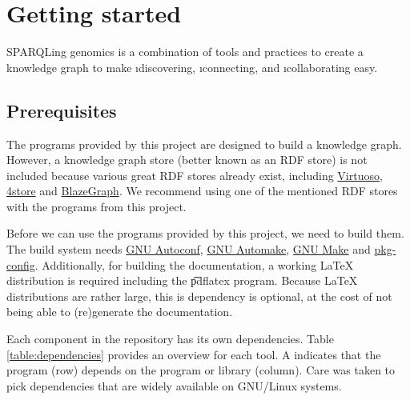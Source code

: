 \chapter{Getting started}

  SPARQLing genomics is a combination of tools and practices to create a
  knowledge graph to make \i{discovering}, \i{connecting}, and
  \i{collaborating} easy.

\section{Prerequisites}
\label{sec:prerequisites}

  The programs provided by this project are designed to build a knowledge graph.
  However, a knowledge graph store (better known as an RDF store) is not included
  because various great RDF stores already exist, including
  \href{https://virtuoso.openlinksw.com/}{Virtuoso},
  \href{https://github.com/4store/4store}{4store} and
  \href{https://www.blazegraph.com/}{BlazeGraph}.  We recommend using one of
  the mentioned RDF stores with the programs from this project.

  Before we can use the programs provided by this project, we need to build
  them.  The build system needs
  \href{https://www.gnu.org/software/autoconf}{GNU Autoconf},
  \href{https://www.gnu.org/software/automake}{GNU Automake},
  \href{https://www.gnu.org/software/make}{GNU Make} and
  \href{https://www.freedesktop.org/wiki/Software/pkg-config/}{pkg-config}.
  Additionally, for building the documentation, a working \LaTeX{} distribution is
  required including the \t{pdflatex} program.  Because \LaTeX{} distributions
  are rather large, this is dependency is optional, at the cost of not being able
  to (re)generate the documentation.

  Each component in the repository has its own dependencies.  Table
  \ref{table:dependencies} provides an overview for each tool.  A \B{}
  indicates that the program (row) depends on the program or library (column).
  Care was taken to pick dependencies that are widely available on GNU/Linux
  systems.

